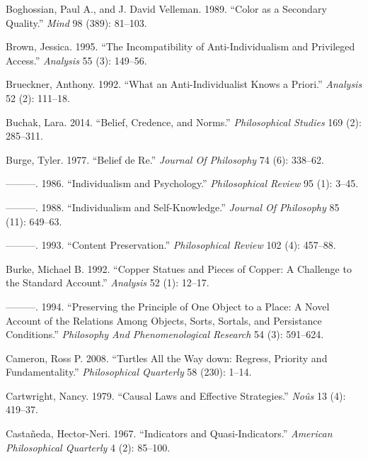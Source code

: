 \documentclass[
  10pt,
  letterpaper,
  DIV=11,
  numbers=noendperiod,
  twoside]{scrartcl}
\newlength{\cslhangindent}
\newenvironment{CSLReferences}[2] %
 {\begin{list}{}{%
  \setlength{\itemindent}{0pt}
  \setlength{\leftmargin}{0pt}
  \setlength{\parsep}{0pt}
  \ifodd #1
   \setlength{\leftmargin}{\cslhangindent}
   \setlength{\itemindent}{-1\cslhangindent}
  \fi
  \setlength{\itemsep}{#2\baselineskip}}}
 {\end{list}}
\begin{document}
\begin{CSLReferences}{1}{0}
Boghossian, Paul A., and J. David Velleman. 1989. {``Color as a
Secondary Quality.''} \emph{Mind} 98 (389): 81--103.

Brown, Jessica. 1995. {``The Incompatibility of Anti-Individualism and
Privileged Access.''} \emph{Analysis} 55 (3): 149--56.

Brueckner, Anthony. 1992. {``What an Anti-Individualist Knows a
Priori.''} \emph{Analysis} 52 (2): 111--18.

Buchak, Lara. 2014. {``Belief, Credence, and Norms.''}
\emph{Philosophical Studies} 169 (2): 285--311.

Burge, Tyler. 1977. {``Belief de Re.''} \emph{Journal Of Philosophy} 74
(6): 338--62.

---------. 1986. {``Individualism and Psychology.''} \emph{Philosophical
Review} 95 (1): 3--45.

---------. 1988. {``Individualism and Self-Knowledge.''} \emph{Journal
Of Philosophy} 85 (11): 649--63.

---------. 1993. {``Content Preservation.''} \emph{Philosophical Review}
102 (4): 457--88.

Burke, Michael B. 1992. {``Copper Statues and Pieces of Copper: A
Challenge to the Standard Account.''} \emph{Analysis} 52 (1): 12--17.

---------. 1994. {``Preserving the Principle of One Object to a Place: A
Novel Account of the Relations Among Objects, Sorts, Sortals, and
Persistance Conditions.''} \emph{Philosophy And Phenomenological
Research} 54 (3): 591--624.

Cameron, Ross P. 2008. {``Turtles All the Way down: Regress, Priority
and Fundamentality.''} \emph{Philosophical Quarterly} 58 (230): 1--14.

Cartwright, Nancy. 1979. {``Causal Laws and Effective Strategies.''}
\emph{Noûs} 13 (4): 419--37.

Castañeda, Hector-Neri. 1967. {``Indicators and Quasi-Indicators.''}
\emph{American Philosophical Quarterly} 4 (2): 85--100.


\end{CSLReferences}
\end{document}
